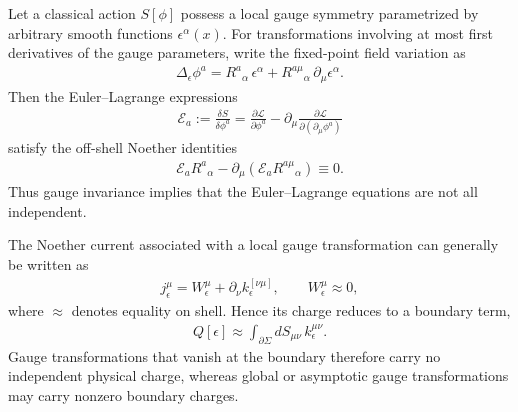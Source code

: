 \documentclass[../QFT_main.tex]{subfiles}
\begin{document}
\begin{mytheorem}
Let a classical action $S[\phi]$ possess a local gauge symmetry
parametrized by arbitrary smooth functions $\epsilon^\alpha(x)$. For
transformations involving at most first derivatives of the gauge
parameters, write the fixed-point field variation as
{\small\begin{align}
    \Delta_\epsilon\phi^a
    =
    R^a{}_\alpha\,\epsilon^\alpha
    +R^{a\mu}{}_\alpha\,\partial_\mu\epsilon^\alpha .
\end{align}}
Then the Euler--Lagrange expressions
{\small\begin{align}
    \mathcal E_a
    :=
    \frac{\delta S}{\delta\phi^a}
    =
    \frac{\partial\mathcal L}{\partial\phi^a}
    -\partial_\mu
     \frac{\partial\mathcal L}{\partial(\partial_\mu\phi^a)}
\end{align}}
satisfy the off-shell Noether identities
{\small\begin{align}
    \mathcal E_a R^a{}_\alpha
    -\partial_\mu
     \left(\mathcal E_a R^{a\mu}{}_\alpha\right)
    \equiv0 .
\end{align}}
Thus gauge invariance implies that the Euler--Lagrange equations are
not all independent.

The Noether current associated with a local gauge transformation can
generally be written as
{\small\begin{align}
    j^\mu_\epsilon
    =
    W^\mu_\epsilon
    +\partial_\nu k^{[\nu\mu]}_\epsilon,
    \qquad
    W^\mu_\epsilon\approx0 ,
\end{align}}
where $\approx$ denotes equality on shell. Hence its charge reduces to
a boundary term,
{\small\begin{align}
    Q[\epsilon]
    \approx
    \int_{\partial\Sigma}
    dS_{\mu\nu}\,k^{\mu\nu}_\epsilon .
\end{align}}
Gauge transformations that vanish at the boundary therefore carry no
independent physical charge, whereas global or asymptotic gauge
transformations may carry nonzero boundary charges.
\end{mytheorem}
\end{document}
